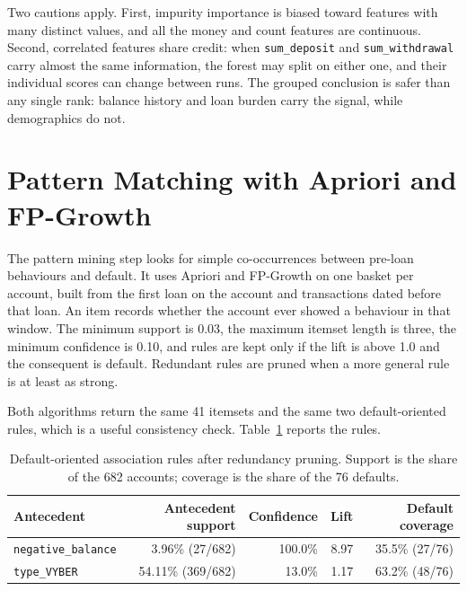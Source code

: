 Two cautions apply. First, impurity importance is biased toward features with many distinct values, and all the money and count features are continuous. Second, correlated features share credit: when \texttt{sum\_deposit} and \texttt{sum\_withdrawal} carry almost the same information, the forest may split on either one, and their individual scores can change between runs. The grouped conclusion is safer than any single rank: balance history and loan burden carry the signal, while demographics do not.

\section{Pattern Matching with Apriori and FP-Growth}
\label{sec:pattern-mining}

The pattern mining step looks for simple co-occurrences between pre-loan behaviours and default. It uses Apriori and FP-Growth on one basket per account, built from the first loan on the account and transactions dated before that loan. An item records whether the account ever showed a behaviour in that window. The minimum support is 0.03, the maximum itemset length is three, the minimum confidence is 0.10, and rules are kept only if the lift is above 1.0 and the consequent is default. Redundant rules are pruned when a more general rule is at least as strong.

Both algorithms return the same 41 itemsets and the same two default-oriented rules, which is a useful consistency check. Table~\ref{tab:pattern-rules} reports the rules.

\begin{table}[H]
    \centering
    \caption{Default-oriented association rules after redundancy pruning. Support is the share of the 682 accounts; coverage is the share of the 76 defaults.}
    \label{tab:pattern-rules}
    \begin{tabular}{@{}l r r r r@{}}
        \toprule
        \textbf{Antecedent} & \textbf{Antecedent support} & \textbf{Confidence} & \textbf{Lift} & \textbf{Default coverage} \\
        \midrule
        \texttt{negative\_balance} & 3.96\% (27/682) & 100.0\% & 8.97 & 35.5\% (27/76) \\
        \texttt{type\_VYBER} & 54.11\% (369/682) & 13.0\% & 1.17 & 63.2\% (48/76) \\
        \bottomrule
    \end{tabular}
\end{table}


